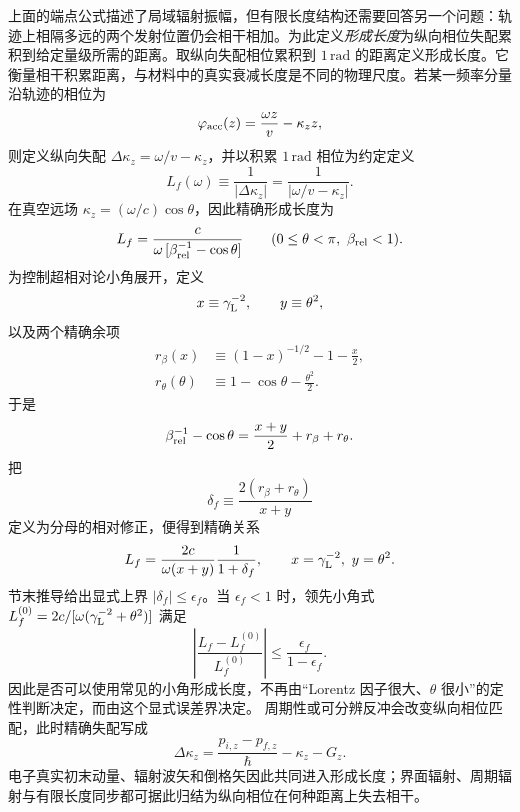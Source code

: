 上面的端点公式描述了局域辐射振幅，但有限长度结构还需要回答另一个问题：轨迹上相隔多远的两个发射位置仍会相干相加。为此定义\emph{形成长度}为纵向相位失配累积到给定量级所需的距离。取纵向失配相位累积到 $1\,\mathrm{rad}$ 的距离定义形成长度。它衡量相干积累距离，与材料中的真实衰减长度是不同的物理尺度。若某一频率分量沿轨迹的相位为
\begin{equation*}
\varphi_{\rm acc}(z)=\frac{\omega z}{v}-\kappa_zz,
\end{equation*}
则定义纵向失配 $\Delta \kappa_z=\omega/v-\kappa_z$，并以积累 $1\,\mathrm{rad}$ 相位为约定定义
\begin{equation}
{
L_f(\omega)\equiv\frac1{|\Delta \kappa_z|}
=\frac1{|\omega/v-\kappa_z|}.}
\label{eq:formation_length_general_mismatch}
\end{equation}
在真空远场 $\kappa_z=(\omega/c)\cos\theta$，因此精确形成长度为
\begin{equation*}
L_f
=\frac{c}{\omega\,[\beta_{\rm rel}^{-1}-\cos\theta]}
\qquad (0\le\theta<\pi,\ \beta_{\rm rel}<1).
\end{equation*}
为控制超相对论小角展开，定义
\begin{equation*}
 x\equiv\gamma_{\rm L}^{-2},
 \qquad y\equiv\theta^2,
\end{equation*}
以及两个精确余项
\begin{align*}
 r_\beta(x)
 &\equiv(1-x)^{-1/2}-1-\frac{x}{2},\\
 r_\theta(\theta)
 &\equiv1-\cos\theta-\frac{\theta^2}{2}.
\end{align*}
于是
\begin{equation*}
\beta_{\rm rel}^{-1}-\cos\theta
=\frac{x+y}{2}+r_\beta+r_\theta.
\end{equation*}
把
\begin{equation*}
\delta_f\equiv\frac{2(r_\beta+r_\theta)}{x+y}
\end{equation*}
定义为分母的相对修正，便得到精确关系
\begin{equation}
{
L_f
=\frac{2c}{\omega(x+y)}\frac{1}{1+\delta_f},
\qquad
x=\gamma_{\rm L}^{-2},\ y=\theta^2.}
\label{eq:formation_length_ultrarelativistic}
\end{equation}
节末推导给出显式上界 $|\delta_f|\le\epsilon_f$。当 $\epsilon_f<1$ 时，领先小角式
$L_f^{(0)}=2c/[\omega(\gamma_{\rm L}^{-2}+\theta^2)]$
满足
\begin{equation*}
\left|\frac{L_f-L_f^{(0)}}{L_f^{(0)}}\right|
\le\frac{\epsilon_f}{1-\epsilon_f}.
\end{equation*}
因此是否可以使用常见的小角形成长度，不再由“Lorentz 因子很大、$\theta$ 很小”的定性判断决定，而由这个显式误差界决定。
周期性或可分辨反冲会改变纵向相位匹配，此时精确失配写成
\begin{equation*}
\Delta \kappa_z
=\frac{p_{i,z}-p_{f,z}}{\hbar}-\kappa_z-G_z.
\end{equation*}
电子真实初末动量、辐射波矢和倒格矢因此共同进入形成长度；界面辐射、周期辐射与有限长度同步都可据此归结为纵向相位在何种距离上失去相干。

